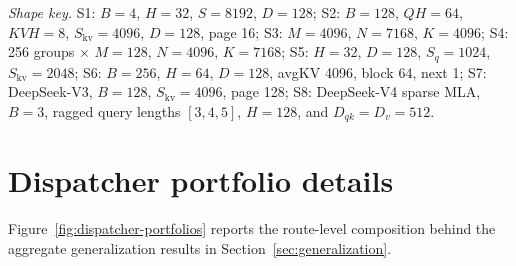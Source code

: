 \documentclass[11pt]{article}
\begin{document}
\begin{table}[H]
  \vspace{3pt}
  \parbox{\linewidth}{\scriptsize\raggedright
    \textit{Shape key.}
    S1: $B=4$, $H=32$, $S=8192$, $D=128$;
    S2: $B=128$, $QH=64$, $KVH=8$, $S_{\mathrm{kv}}=4096$, $D=128$, page 16;
    S3: $M=4096$, $N=7168$, $K=4096$;
    S4: 256 groups $\times$ $M=128$, $N=4096$, $K=7168$;
    S5: $H=32$, $D=128$, $S_q=1024$, $S_{\mathrm{kv}}=2048$;
    S6: $B=256$, $H=64$, $D=128$, avgKV 4096, block 64, next 1;
    S7: DeepSeek-V3, $B=128$, $S_{\mathrm{kv}}=4096$, page 128;
    S8: DeepSeek-V4 sparse MLA, $B=3$, ragged query
    lengths $[3,4,5]$, $H=128$, and $D_{qk}=D_v=512$.}
\end{table}

\FloatBarrier

\section{Dispatcher portfolio details}
\label{app:dispatcher-details}

Figure~\ref{fig:dispatcher-portfolios} reports the route-level composition
behind the aggregate generalization results in
Section~\ref{sec:generalization}.



\FloatBarrier
\end{document}
